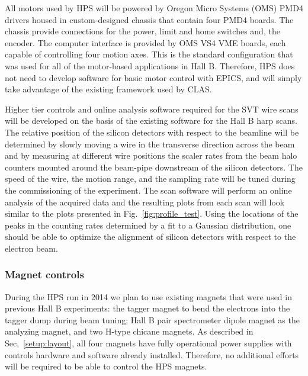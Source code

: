 All motors used by HPS  will be powered by Oregon Micro Systems (OMS) PMD4 drivers housed in custom-designed chassis 
that contain four PMD4 boards. The chassis provide connections for the power, limit and home switches and, the encoder. 
The computer interface is provided by OMS VS4 VME boards, each capable of controlling four motion axes.  
This is the standard configuration that was  used for all of the motor-based applications in Hall B. Therefore, 
HPS does not need to develop software for basic motor control with EPICS, and will simply take advantage of the existing 
framework used by CLAS.

Higher tier controls and online analysis software required for the SVT wire scans will be developed on the basis of 
the existing software for the Hall B harp scans.  
The relative position of the silicon detectors with respect to the beamline will be determined by slowly moving 
a wire in the transverse direction across the beam and by measuring at different wire positions the scaler rates from 
the beam halo counters mounted around the beam-pipe downstream of the silicon detectors. The speed of the wire, the motion 
range, and the sampling rate will be tuned during the commissioning of the experiment. The scan software will perform 
an online analysis of the acquired data and the resulting plots from each scan will look similar to the plots presented in 
Fig.~\ref{fig:profile_test}. Using the locations of the peaks in the counting rates determined by a fit to a Gaussian 
distribution, one should be able to optimize the alignment of silicon detectors with respect to the electron beam.



\subsubsection{Magnet controls}
\label{sec:ctrls:magnet}
During the HPS run in 2014 we plan to use existing magnets that were used in previous Hall B experiments: 
the tagger magnet to bend the electrons into the tagger dump during beam tuning; Hall B pair spectrometer dipole magnet 
as the analyzing magnet, and two H-type chicane magnets. As described in Sec,~\ref{setup:layout}, all four magnets have 
fully operational power supplies with  controls hardware and software already installed. Therefore, no additional 
efforts will be required to be able to control the HPS magnets.     
   


